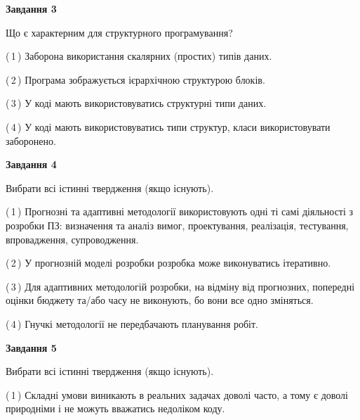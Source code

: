 \documentclass[10pt, ukrainian]{article}
\begin{document}
{\begin {large}
{\begin {center}\textbf{Завдання 3}\end {center}}\par
Що є характерним для структурного програмування?\par
\vspace{2mm}



(\,1\,) Заборона використання скалярних (простих) типів даних. %



(\,2\,) Програма зображується ієрархічною структурою блоків.%



(\,3\,) У коді мають використовуватись структурні типи даних. %



(\,4\,) У коді мають використовуватись типи структур, класи використовувати заборонено. %


{\begin {center}\textbf{Завдання 4}\end {center}}\par
Вибрати всі істинні твердження (якщо існують).\par
\vspace{2mm}



(\,1\,) Прогнозні та адаптивні методології використовують одні ті самі діяльності з розробки ПЗ: визначення та аналіз вимог, проектування, реалізація, тестування, впровадження, супроводження. %



(\,2\,) У прогнозній моделі розробки розробка може виконуватись ітеративно. %



(\,3\,) Для адаптивних методологій розробки, на відміну від прогнозних, попередні оцінки бюджету та/або часу не виконують, бо вони все одно зміняться. %



(\,4\,) Гнучкі методології не передбачають планування робіт. %


{\begin {center}\textbf{Завдання 5}\end {center}}\par
Вибрати всі істинні твердження (якщо існують).\par
\vspace{2mm}



(\,1\,) Складні умови виникають в реальних задачах доволі часто, а тому є доволі природніми і не можуть вважатись недоліком коду. %




\end{large}}
\end{document}
